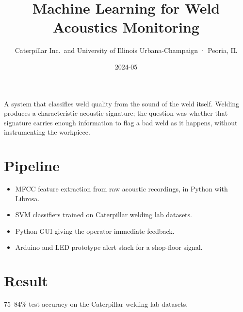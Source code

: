 \title{Machine Learning for Weld Acoustics Monitoring}
\subtitle{Caterpillar Inc.\ and University of Illinois Urbana-Champaign · Peoria, IL}
\date{2024-05}




A system that classifies weld quality from the sound of the weld itself.
Welding produces a characteristic acoustic signature; the question was whether
that signature carries enough information to flag a bad weld as it happens,
without instrumenting the workpiece.

\section{Pipeline}

\begin{itemize}
  \item MFCC feature extraction from raw acoustic recordings, in Python with
        Librosa.
  \item SVM classifiers trained on Caterpillar welding lab datasets.
  \item Python GUI giving the operator immediate feedback.
  \item Arduino and LED prototype alert stack for a shop-floor signal.
\end{itemize}


\section{Result}

75--84\% test accuracy on the Caterpillar welding lab datasets.


